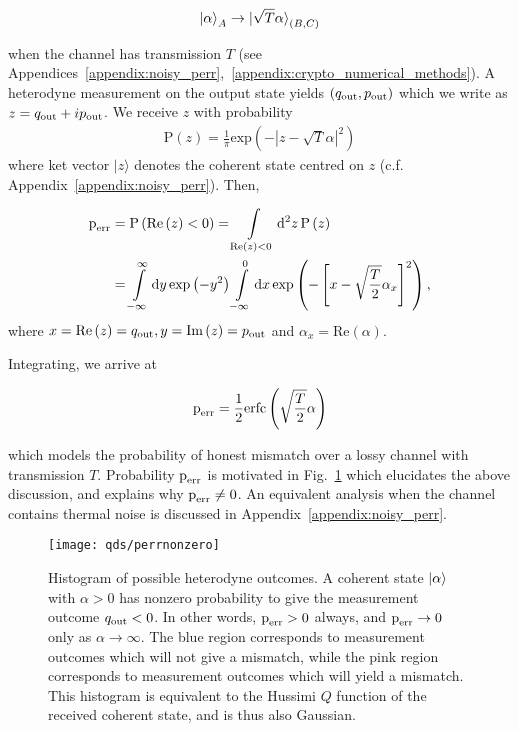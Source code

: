 \begin{equation}
\ket{\alpha}_A \rightarrow \ket{\sqrt{T}\alpha}_{\left(B, C\right)}
\end{equation}


\noindent when the channel has transmission $T$ (see Appendices~\ref{appendix:noisy_perr},~\ref{appendix:crypto_numerical_methods}). A heterodyne measurement on the output state yields $\left(q_{\text{out}}, p_{\text{out}}\right)$ which we write as $z = q_{\text{out}} + i p_{\text{out}}$. We receive $z$ with probability
\begin{align}
\text{P}\left(z\right) = \frac{1}{\pi}\text{exp}\left( - \left| z - \sqrt{T}\alpha \right|^2 \right)
\end{align}
where ket vector $|z\rangle$ denotes the coherent state centred on $z$ (c.f. Appendix~\ref{appendix:noisy_perr}). Then,

\begin{align}
\text{p}_{\text{err}} &= \text{P}\left(\text{Re}\left(z\right)<0\right) = \int\limits_{\text{Re}\left(z\right)<0}\mathop{}\!\mathrm{d^2} z \, \text{P}\left(z\right) \notag \\
&= \int\limits_{-\infty}^{\infty} \mathrm{d} y \, \text{exp}\left(-y^2\right) \int\limits_{-\infty}^{0} \mathrm{d} x \, \text{exp}\left(-\left[x - \sqrt{\frac{T}{2}}\alpha_x\right]^2\right),
\end{align}
where $x = \text{Re}\left(z\right)=q_{\text{out}}, y = \text{Im}\left(z\right)=p_{\text{out}}$ and $\alpha_x = \text{Re}\left(\alpha\right)$. 

Integrating, we arrive at

\begin{equation}\label{eqn:perr}
\text{p}_{\text{err}} = \frac{1}{2}\text{erfc}\left(\sqrt{\frac{T}{2}}\alpha\right)
\end{equation}

\noindent which models the probability of honest mismatch over a lossy channel with transmission $T$. Probability $\text{p}_{\text{err}}$ is motivated in Fig.~\ref{fig:perr} which elucidates the above discussion, and explains why $\text{p}_{\text{err}} \ne 0$. An equivalent analysis when the channel contains thermal noise is discussed in Appendix~\ref{appendix:noisy_perr}.

\begin{figure}[htp]
\captionsetup{width=0.8\linewidth}
\centering
\texttt{[image: qds/perrnonzero]}
\caption{\label{fig:perr} Histogram of possible heterodyne outcomes. A coherent state $\ket{\alpha}$ with $\alpha>0$ has nonzero probability to give the measurement outcome $q_{\text{out}} < 0$. In other words, $\text{p}_{\text{err}} > 0$ always, and $\text{p}_{\text{err}} \rightarrow 0$ only as $\alpha \rightarrow \infty$. The blue region corresponds to measurement outcomes which will not give a mismatch, while the pink region corresponds to measurement outcomes which will yield a mismatch. This histogram is equivalent to the Hussimi $Q$ function \cite{Leonhardt2010} of the received coherent state, and is thus also Gaussian.}
\end{figure}


